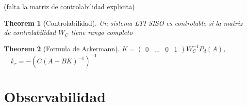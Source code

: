 \documentclass[leqno]{article}
\newtheorem*{theorem}{Theorem}
\begin{document}
(falta la matriz de controlabilidad explicita)

\begin{theorem}[Controlabilidad] Un sistema LTI SISO es controlable si la matriz de controlabilidad $W_C$ tiene rango completo
\end{theorem}

\begin{theorem}[Formula de Ackermann]
  $K = \begin{pmatrix}  0 & \ldots & 0 & 1 \end{pmatrix} W_C^{-1}P_d(A) $, $\quad k_r = -(C(A-BK)^{-1})^{-1}$
\end{theorem}



\section{Observabilidad}
\end{document}
